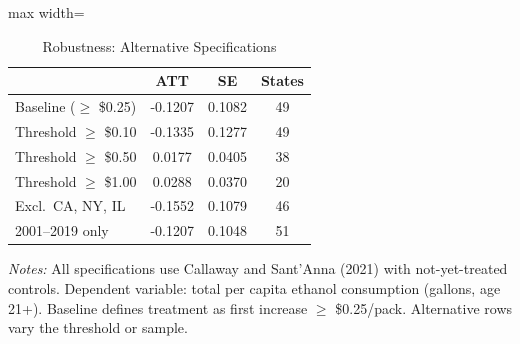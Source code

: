 \begin{table}[H]
\centering
\caption{Robustness: Alternative Specifications}
\label{tab:robust}
\begin{threeparttable}
\begin{adjustbox}{max width=\textwidth}
\begin{tabular}{lccc}
\toprule
 & ATT & SE & States \\
\midrule
Baseline ($\geq$ \$0.25) & -0.1207 & 0.1082 & 49 \\
Threshold $\geq$ \$0.10 & -0.1335 & 0.1277 & 49 \\
Threshold $\geq$ \$0.50 & 0.0177 & 0.0405 & 38 \\
Threshold $\geq$ \$1.00 & 0.0288 & 0.0370 & 20 \\
Excl.\ CA, NY, IL & -0.1552 & 0.1079 & 46 \\
2001--2019 only & -0.1207 & 0.1048 & 51 \\
\bottomrule
\end{tabular}
\end{adjustbox}
\begin{tablenotes}[flushleft]
\small
\item \textit{Notes:} All specifications use Callaway and Sant'Anna (2021) with not-yet-treated controls. Dependent variable: total per capita ethanol consumption (gallons, age 21+). Baseline defines treatment as first increase $\geq$ \$0.25/pack. Alternative rows vary the threshold or sample.
\end{tablenotes}
\end{threeparttable}
\end{table}
